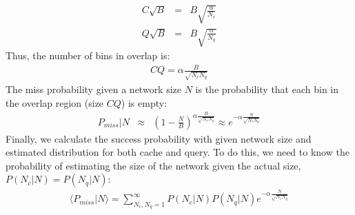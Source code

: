 \documentclass[9.5pt,journal,final,finalsubmission,twocolumn]{IEEEtran}
\begin{document}
\begin{eqnarray*}
C \sqrt{B} &=& B\sqrt{\frac{\alpha}{N_c}} \\
Q \sqrt{B} &=& B\sqrt{\frac{\alpha}{N_q}}
\end{eqnarray*}
Thus, the number of bins in overlap is:
\begin{eqnarray*}
CQ = \alpha\frac{B}{\sqrt{N_c N_q}}
\end{eqnarray*}
The miss probability given a network size $N$ is the probability
that each bin in the overlap region (size $CQ$) is empty:
\begin{eqnarray*}
P_{miss}|N &\approx& \left(1-\frac{N}{B}\right)^{\alpha \frac{B}{\sqrt{N_c N_q}}} 
  \approx e^{-\alpha \frac{N}{\sqrt{N_c N_q}}}
\end{eqnarray*}
Finally, we calculate the success probability with given network size and
estimated distribution for both cache and query.  To do this, we need to know
the probability of estimating the size of the network given the actual size,
$P(N_c|N)=P(N_q|N)$:
\begin{eqnarray*}
\langle P_{miss} | N\rangle = \sum_{N_c,N_q=1}^{\infty}P(N_c|N)P(N_q|N) e^{-\alpha \frac{N}{\sqrt{N_c N_q}}}
\end{eqnarray*}
\end{document}
